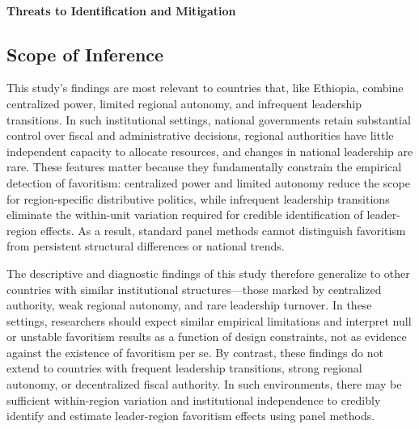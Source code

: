 \documentclass[12pt,a4paper]{article}
\begin{document}
\paragraph{Threats to Identification and Mitigation}
\subsection*{Scope of Inference}

This study’s findings are most relevant to countries that, like Ethiopia, combine centralized power, limited regional autonomy, and infrequent leadership transitions. In such institutional settings, national governments retain substantial control over fiscal and administrative decisions, regional authorities have little independent capacity to allocate resources, and changes in national leadership are rare. These features matter because they fundamentally constrain the empirical detection of favoritism: centralized power and limited autonomy reduce the scope for region-specific distributive politics, while infrequent leadership transitions eliminate the within-unit variation required for credible identification of leader-region effects. As a result, standard panel methods cannot distinguish favoritism from persistent structural differences or national trends.

The descriptive and diagnostic findings of this study therefore generalize to other countries with similar institutional structures—those marked by centralized authority, weak regional autonomy, and rare leadership turnover. In these settings, researchers should expect similar empirical limitations and interpret null or unstable favoritism results as a function of design constraints, not as evidence against the existence of favoritism per se. By contrast, these findings do not extend to countries with frequent leadership transitions, strong regional autonomy, or decentralized fiscal authority. In such environments, there may be sufficient within-region variation and institutional independence to credibly identify and estimate leader-region favoritism effects using panel methods.
\end{document}
